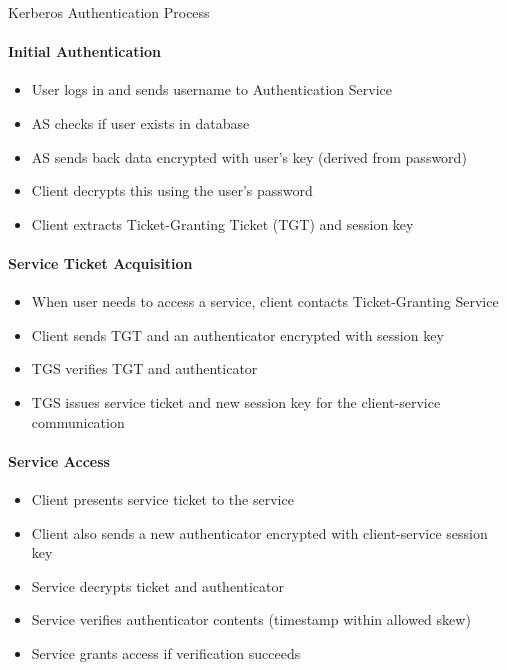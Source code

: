 \begin{KR}{Kerberos Authentication Process}
\paragraph{Initial Authentication}
\begin{itemize}
    \item User logs in and sends username to Authentication Service
    \item AS checks if user exists in database
    \item AS sends back data encrypted with user's key (derived from password)
    \item Client decrypts this using the user's password
    \item Client extracts Ticket-Granting Ticket (TGT) and session key
\end{itemize}

\paragraph{Service Ticket Acquisition}
\begin{itemize}
    \item When user needs to access a service, client contacts Ticket-Granting Service
    \item Client sends TGT and an authenticator encrypted with session key
    \item TGS verifies TGT and authenticator
    \item TGS issues service ticket and new session key for the client-service communication
\end{itemize}

\paragraph{Service Access}
\begin{itemize}
    \item Client presents service ticket to the service
    \item Client also sends a new authenticator encrypted with client-service session key
    \item Service decrypts ticket and authenticator
    \item Service verifies authenticator contents (timestamp within allowed skew)
    \item Service grants access if verification succeeds
\end{itemize}
\end{KR}

